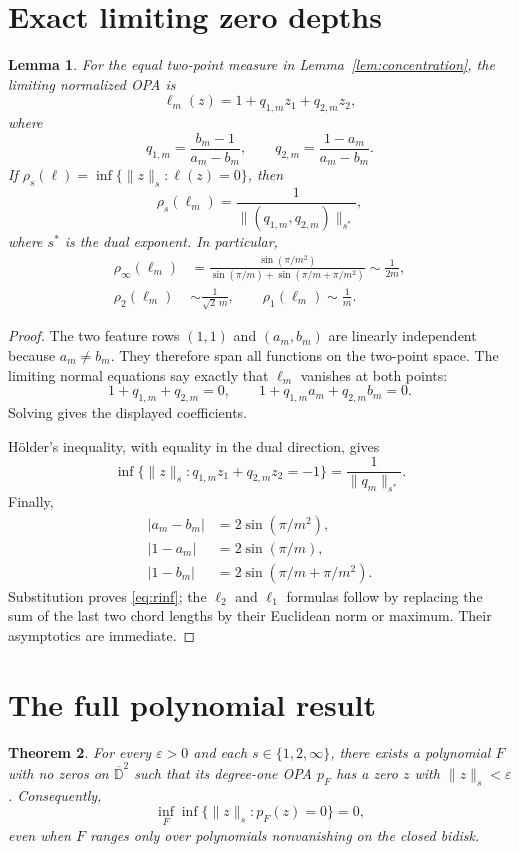 \documentclass[11pt]{article}
\newtheorem{theorem}{Theorem}
\newtheorem{lemma}[theorem]{Lemma}
\newcommand{\D}{\mathbb D}
\begin{document}
\section{Exact limiting zero depths}

\begin{lemma}\label{lem:depth}
For the equal two-point measure in Lemma~\ref{lem:concentration}, the limiting
normalized OPA is
\[
 \ell_m(z)=1+q_{1,m}z_1+q_{2,m}z_2,
\]
where
\[
 q_{1,m}=\frac{b_m-1}{a_m-b_m},
 \qquad
 q_{2,m}=\frac{1-a_m}{a_m-b_m}.
\]
If \(\rho_s(\ell)=\inf\{\|z\|_s:\ell(z)=0\}\), then
\[
 \rho_s(\ell_m)=\frac1{\|(q_{1,m},q_{2,m})\|_{s^*}},
\]
where \(s^*\) is the dual exponent. In particular,
\begin{align}
 \rho_\infty(\ell_m)
 &=\frac{\sin(\pi/m^2)}
 {\sin(\pi/m)+\sin(\pi/m+\pi/m^2)}
 \sim\frac1{2m},\label{eq:rinf}\\
 \rho_2(\ell_m)
 &\sim\frac1{\sqrt2\,m},
 \qquad
 \rho_1(\ell_m)\sim\frac1m.\label{eq:rother}
\end{align}
\end{lemma}

\begin{proof}
The two feature rows \((1,1)\) and \((a_m,b_m)\) are linearly independent
because \(a_m\ne b_m\). They therefore span all functions on the two-point
space. The limiting normal equations say exactly that \(\ell_m\) vanishes
at both points:
\[
 1+q_{1,m}+q_{2,m}=0,
 \qquad
 1+q_{1,m}a_m+q_{2,m}b_m=0.
\]
Solving gives the displayed coefficients.

H\"older's inequality, with equality in the dual direction, gives
\[
 \inf\bigl\{\|z\|_s:q_{1,m}z_1+q_{2,m}z_2=-1\bigr\}
 =\frac1{\|q_m\|_{s^*}}.
\]
Finally,
\begin{align*}
 |a_m-b_m|&=2\sin(\pi/m^2),\\
 |1-a_m|&=2\sin(\pi/m),\\
 |1-b_m|&=2\sin(\pi/m+\pi/m^2).
\end{align*}
Substitution proves \eqref{eq:rinf}; the \(\ell_2\) and \(\ell_1\) formulas
follow by replacing the sum of the last two chord lengths by their Euclidean
norm or maximum. Their asymptotics are immediate.
\end{proof}

\section{The full polynomial result}

\begin{theorem}\label{thm:main}
For every \(\varepsilon>0\) and each
\(s\in\{1,2,\infty\}\), there exists a polynomial \(F\) with no zeros on
\(\overline{\D}^2\) such that its degree-one OPA \(p_F\) has a zero \(z\)
with \(\|z\|_s<\varepsilon\). Consequently,
\[
 \inf_F \inf\bigl\{\|z\|_s:p_F(z)=0\bigr\}=0,
\]
even when \(F\) ranges only over polynomials nonvanishing on the closed
bidisk.
\end{theorem}
\end{document}
